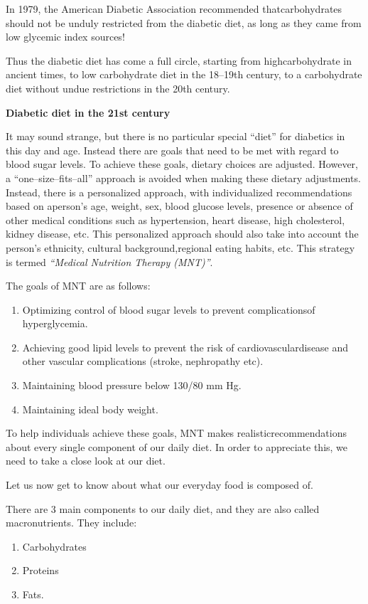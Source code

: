 In 1979, the American Diabetic Association recommended that\break carbohydrates should not be unduly restricted from the diabetic diet, as long as they came from low glycemic index sources!

Thus the diabetic diet has come a full circle, starting from high\break carbohydrate in ancient times, to low carbohydrate diet in the 18–19th century, to a carbohydrate diet without undue restrictions in the 20th century.

\noindent\textbf{Diabetic diet in the 21st century}

It may sound strange, but there is no particular special “diet” for diabetics in this day and age. Instead there are goals that need to be met with regard to blood sugar levels. To achieve these goals, dietary choices are adjusted. However, a “one–size–fits–all” approach is avoided when making these dietary adjustments. Instead, there is a persona\-lized approach, with individualized recommendations based on a\break person’s age, weight, sex, blood glucose levels, presence or absence of other medical conditions such as hypertension, heart disease, high cholesterol, kidney disease, etc. This personalized approach should also take into account the person’s ethnicity, cultural background,\break regional eating habits, etc. This strategy is termed \textit{“Medical Nutrition Therapy (MNT)”}.

\clearpage
\noindent The goals of MNT are as follows:
\begin{enumerate}[•]
\itemsep=0pt
\item Optimizing control of blood sugar levels to prevent complications\break of hyperglycemia.
\item Achieving good lipid levels to prevent the risk of cardiovascular\break disease and other vascular complications (stroke, nephropathy etc).
\item Maintaining blood pressure below 130/80 mm Hg.
\item Maintaining ideal body weight.
\end{enumerate}

To help individuals achieve these goals, MNT makes realistic\break recommendations about every single component of our daily diet. In order to appreciate this, we need to take a close look at our diet.

Let us now get to know about what our everyday food is composed of.

There are 3 main components to our daily diet, and they are also called macronutrients. They include:
\begin{enumerate}
\itemsep=0pt
\item Carbohydrates
\item Proteins
\item Fats.
\end{enumerate}

